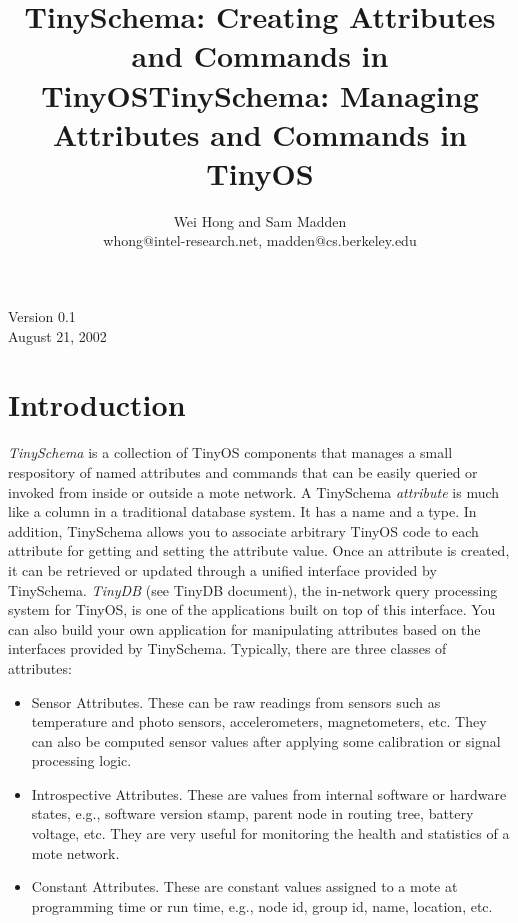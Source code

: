\documentclass[11pt]{article}
\title{\vspace{2.5in} TinySchema: Creating Attributes and Commands in TinyOS}
\title{TinySchema: Managing Attributes and Commands in TinyOS}
\author{Wei Hong and Sam Madden \\
	whong@intel-research.net, madden@cs.berkeley.edu}
\date{}
\begin{document}

\maketitle
\begin{latexonly}
\vspace{2in}
\end{latexonly}
\begin{center}
Version 0.1 \\
August 21, 2002
\end{center}


\begin{latexonly}\newpage\end{latexonly}
\section{Introduction}

{\em TinySchema} is a collection of TinyOS components that manages
a small respository of named attributes and commands that can be
easily queried or invoked from inside or outside a mote network.
A TinySchema {\em attribute} is much like a column in a traditional database system.
It has a name and a type.  In addition, TinySchema allows you to
associate arbitrary TinyOS code to each attribute for getting
and setting the attribute value.  Once an attribute is created, it can
be retrieved or updated through a unified interface provided by TinySchema.
{\em TinyDB} (see TinyDB document), the in-network query
processing system for TinyOS, is one of the applications built on top
of this interface.  You can also build your own application for manipulating
attributes based on the interfaces provided by TinySchema.  Typically, there
are three classes of attributes:
\begin{itemize}
\item Sensor Attributes.  These can be raw readings from sensors such as
temperature and photo sensors, accelerometers, magnetometers, etc.
They can also be computed sensor values after applying some calibration
or signal processing logic.
\item Introspective Attributes.  These are values from internal
software or hardware states, e.g., software version stamp, parent node
in routing tree, battery voltage, etc.  They are very useful for
monitoring the health and statistics of a mote network.
\item Constant Attributes.  These are constant values assigned to
a mote at programming time or run time, e.g., node id, group id, name,
location, etc.
\end{itemize}
\end{document}
